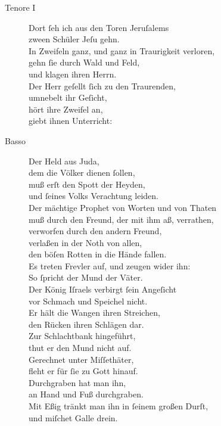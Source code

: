 \documentclass[parskip=full]{scrreprt}
\begin{document}
\begin{description}
  \item[Tenore I]
  Dort ſeh ich aus den Toren Jeruſalems\\
  zween Schüler Jeſu gehn.\\
  In Zweifeln ganz, und ganz in Traurigkeit verloren,\\
  gehn ſie durch Wald und Feld,\\
  und klagen ihren Herrn.\\
  Der Herr geſellt ſich zu den Traurenden,\\
  umnebelt ihr Geſicht,\\
  hört ihre Zweifel an,\\
  giebt ihnen Unterricht:

  \item[Basso]
  Der Held aus Juda,\\
  dem die Völker dienen ſollen,\\
  muß erſt den Spott der Heyden,\\
  und ſeines Volks Verachtung leiden.\\
  Der mächtige Prophet von Worten und von Thaten\\
  muß durch den Freund, der mit ihm aß, verrathen,\\
  verworfen durch den andern Freund,\\
  verlaßen in der Noth von allen,\\
  den böſen Rotten in die Hände fallen.\\
  Es treten Frevler auf, und zeugen wider ihn:\\
  So ſpricht der Mund der Väter.\\
  Der König Iſraels verbirgt ſein Angeſicht\\
  vor Schmach und Speichel nicht.\\
  Er hält die Wangen ihren Streichen,\\
  den Rücken ihren Schlägen dar.\\
  Zur Schlachtbank hingeführt,\\
  thut er den Mund nicht auf.\\
  Gerechnet unter Miſſethäter,\\
  fleht er für ſie zu Gott hinauf.\\
  Durchgraben hat man ihn,\\
  an Hand und Fuß durchgraben.\\
  Mit Eßig tränkt man ihn in ſeinem großen Durſt,\\
  und miſchet Galle drein.\\

\end{description}
\end{document}
